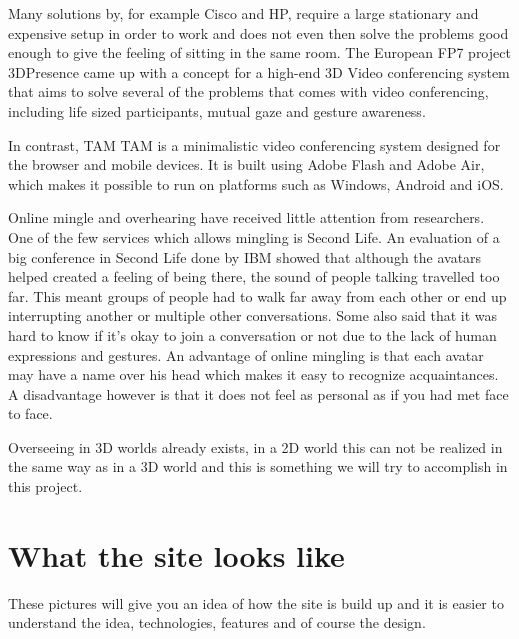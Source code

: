 \documentclass[12pt, titlepage]{article}
\begin{document}
Many solutions by, for example Cisco and HP, require a large stationary and expensive setup in order to work and does not even then solve the problems good enough to give the feeling of sitting in the same room. The European FP7 project 3DPresence\cite{26} came up with a concept for a high-end 3D Video conferencing system that aims to solve several of the problems that comes with video conferencing, including life sized participants, mutual gaze and gesture awareness.

In contrast, TAM TAM\cite{27} is a minimalistic video conferencing system designed for the browser and mobile devices. It is built using Adobe Flash and Adobe Air, which makes it possible to run on platforms such as Windows, Android and iOS.

Online mingle and overhearing have received little attention from researchers. One of the few services which allows mingling is Second Life\cite{5}. An evaluation of a big conference in Second Life done by IBM\cite{1} showed that although the avatars helped created a feeling of being there, the sound of people talking travelled too far. This meant groups of people had to walk far away from each other or end up interrupting another or multiple other conversations. Some also said that it was hard to know if it's okay to join a conversation or not due to the lack of human expressions and gestures. An advantage of online mingling is that each avatar may have a name over his head which makes it easy to recognize acquaintances. A disadvantage however is that it does not feel as personal as if you had met face to face\cite{6}.

Overseeing in 3D worlds already exists\cite{5}\cite{13}\cite{14}\cite{15}, in a 2D world this can not be realized in the same way as in a 3D world and this is something we will try to accomplish in this project.
\section{What the site looks like}
These pictures will give you an idea of how the site is build up and it is easier to understand the idea, technologies, features and of course the design.
\end{document}
